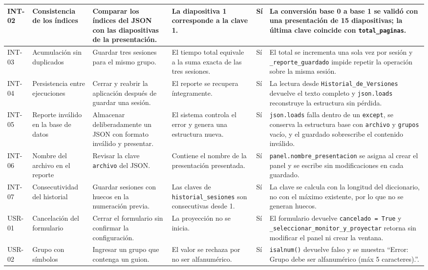 \documentclass[12pt,letterpaper]{article}
\begin{document}
{\begin{longtable}{|L{1.1cm}|L{2.3cm}|L{3.2cm}|L{3.6cm}|L{1.2cm}|L{3.6cm}|}
INT-02 & Consistencia de los índices & Comparar los índices del JSON con las diapositivas de la presentación. & La diapositiva 1 corresponde a la clave 1. & Sí & La conversión base 0 a base 1 se validó con una presentación de 15 diapositivas; la última clave coincide con \texttt{total\_paginas}. \\ \hline
INT-03 & Acumulación sin duplicados & Guardar tres sesiones para el mismo grupo. & El tiempo total equivale a la suma exacta de las tres sesiones. & Sí & El total se incrementa una sola vez por sesión y \texttt{\_reporte\_guardado} impide repetir la operación sobre la misma sesión. \\ \hline
INT-04 & Persistencia entre ejecuciones & Cerrar y reabrir la aplicación después de guardar una sesión. & El reporte se recupera íntegramente. & Sí & La lectura desde \texttt{Historial\_de\_Versiones} devuelve el texto completo y \texttt{json.loads} reconstruye la estructura sin pérdida. \\ \hline
INT-05 & Reporte inválido en la base de datos & Almacenar deliberadamente un JSON con formato inválido y presentar. & El sistema controla el error y genera una estructura nueva. & Sí & \texttt{json.loads} falla dentro de un \texttt{except}, se conserva la estructura base con \texttt{archivo} y \texttt{grupos} vacío, y el guardado sobrescribe el contenido inválido. \\ \hline
INT-06 & Nombre del archivo en el reporte & Revisar la clave \texttt{archivo} del JSON. & Contiene el nombre de la presentación presentada. & Sí & \texttt{panel.nombre\_presentacion} se asigna al crear el panel y se escribe sin modificaciones en cada guardado. \\ \hline
INT-07 & Consecutividad del historial & Guardar sesiones con huecos en la numeración previa. & Las claves de \texttt{historial\_sesiones} son consecutivas desde 1. & Sí & La clave se calcula con la longitud del diccionario, no con el máximo existente, por lo que no se generan huecos. \\ \hline
USR-01 & Cancelación del formulario & Cerrar el formulario sin confirmar la configuración. & La proyección no se inicia. & Sí & El formulario devuelve \texttt{cancelado = True} y \texttt{\_seleccionar\_monitor\_y\_proyectar} retorna sin modificar el panel ni crear la ventana. \\ \hline
USR-02 & Grupo con símbolos & Ingresar un grupo que contenga un guion. & El valor se rechaza por no ser alfanumérico. & Sí & \texttt{isalnum()} devuelve falso y se muestra ``Error: Grupo debe ser alfanumérico (máx 5 caracteres).''. \\ \hline

\end{longtable}}
\end{document}
